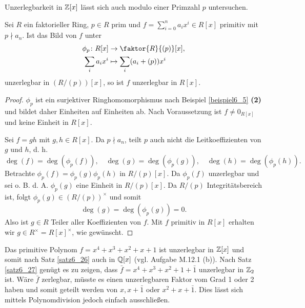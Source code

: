 Unzerlegbarkeit in $\mathbb{Z}[x]$ lässt sich auch modulo einer Primzahl $p$ untersuchen.
\begin{satz}\label{satz6_27}
	Sei $R$ ein faktorieller Ring, $p \in R$ prim und $f = \sum_{i=0}^n a_i x^i \in R[x]$ primitiv mit $p \nmid a_n$. Ist das Bild von $f$ unter
	\begin{align*}
		\phi_p \colon R[x] &\to \faktor{R}{(p)} [x],\\
		\sum_{i} a_i x^i &\mapsto \sum_i (a_i + (p)) x^i
	\end{align*}
	unzerlegbar in $(R/(p))[x]$, so ist $f$ unzerlegbar in $R[x]$.
\end{satz}
\begin{proof}
	$\phi_p$ ist ein surjektiver Ringhomomorphismus nach Beispiel \ref{beispiel6_5} \textbf{(2)} und bildet daher Einheiten auf Einheiten ab. Nach Voraussetzung ist $f \neq 0_{R[x]}$ und keine Einheit in $R[x]$. 
	
	Sei $f = gh$ mit $g,h \in R[x]$. Da $p \nmid a_n$, teilt $p$ auch nicht die Leitkoeffizienten von $g$ und $h$, d. h.
	\[\deg(f) = \deg(\phi_p(f)), \quad \deg(g) = \deg(\phi_p(g)), \quad \deg(h) = \deg(\phi_p(h)).\]
	Betrachte $\phi_p(f) = \phi_p(g) \phi_p(h)$ in $R/(p) [x]$. Da $\phi_p(f)$ unzerlegbar und sei o. B. d. A. $\phi_p(g)$ eine Einheit in $R/(p) [x]$. Da $R/(p)$ Integritätsbereich ist, folgt $\phi_p(g) \in (R/(p))^\times$ und somit 
	\[\deg(g) = \deg(\phi_p(g)) = 0.\]
	Also ist $g \in R$ Teiler aller Koeffizienten von $f$. Mit $f$ primitiv in $R[x]$ erhalten wir $g \in R^\times = R[x]^\times$, wie gewünscht.
\end{proof}
\begin{beispiel}\label{beispiel6_28}
	Das primitive Polynom $f = x^4 + x^3 + x^2 + x + 1$ ist unzerlegbar in $\mathbb{Z}[x]$ und somit nach Satz \ref{satz6_26} auch in $\mathbb{Q}[x]$ (vgl. Aufgabe M.12.1 (b)). Nach Satz \ref{satz6_27} genügt es zu zeigen, dass $\bar{f} = x^4 + x^3 + x^2 + 1 +\bar{1}$ unzerlegbar in $\mathbb{Z}_2$ ist. Wäre $\bar{f}$ zerlegbar, müsste es einen unzerlegbaren Faktor vom Grad 1 oder 2 haben und somit geteilt werden von $x, x + \bar{1}$ oder $x^2 + x + \bar{1}$. Dies lässt sich mittels Polynomdivision jedoch einfach ausschließen.
\end{beispiel}